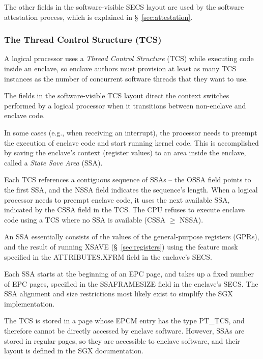 The other fields in the software-visible SECS layout are used by the
software attestation process, which is explained in \S~\ref{sec:attestation}.


\subsubsection{The Thread Control Structure (TCS)}
\label{sec:tcs}


A logical processor uses a \textit{Thread Control Structure} (TCS) while
executing code inside an enclave, so enclave authors must provision at least as
many TCS instances as the number of concurrent software threads that they want
to use.

The fields in the software-visible TCS layout direct the context switches
performed by a logical processor when it transitions between non-enclave and
enclave code.


In some cases (e.g., when receiving an interrupt), the processor needs to
preempt the execution of enclave code and start running kernel code. This is
accomplished by saving the enclave's context (register values) to an area
inside the enclave, called a \textit{State Save Area} (SSA).

Each TCS references a contiguous sequence of SSAs -- the OSSA field points to
the first SSA, and the NSSA field indicates the sequence's length. When a
logical processor needs to preempt enclave code, it uses the next available
SSA, indicated by the CSSA field in the TCS. The CPU refuses to execute enclave
code using a TCS where no SSA is available (CSSA $\ge$ NSSA).

An SSA essentially consists of the values of the general-purpose registers
(GPRs), and the result of running XSAVE (\S~\ref{sec:registers}) using the
feature mask specified in the ATTRIBUTES.XFRM field in the enclave's SECS.


Each SSA starts at the beginning of an EPC page, and takes up a fixed number of
EPC pages, specified in the SSAFRAMESIZE field in the enclave's SECS. The SSA
alignment and size restrictions most likely exist to simplify the SGX
implementation.

The TCS is stored in a page whose EPCM entry has the type PT\_TCS, and
therefore cannot be directly accessed by enclave software. However, SSAs are
stored in regular pages, so they are accessible to enclave software, and their
layout is defined in the SGX documentation.


